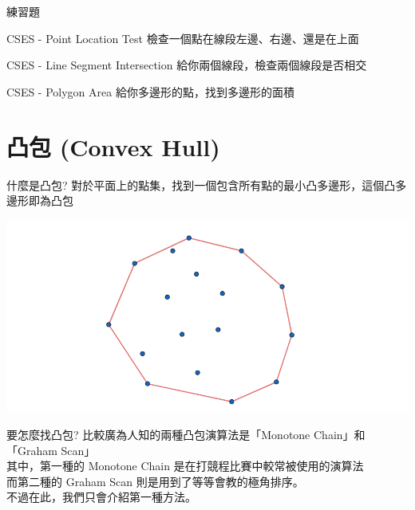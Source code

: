 \documentclass[aspectratio=169]{beamer}
\begin{document}
\begin{frame}{練習題}
    \begin{block}{CSES - Point Location Test}
        檢查一個點在線段左邊、右邊、還是在上面
    \end{block}
    \begin{block}{CSES - Line Segment Intersection}
        給你兩個線段，檢查兩個線段是否相交
    \end{block}
    \begin{block}{CSES - Polygon Area}
        給你多邊形的點，找到多邊形的面積
    \end{block}
\end{frame}

\section{凸包 (Convex Hull)}

\begin{frame}{什麼是凸包?}
    對於平面上的點集，找到一個包含所有點的最小凸多邊形，這個凸多邊形即為凸包
    \begin{center}
        \includegraphics[scale=0.5]{images/convex_hull.png}
    \end{center}
\end{frame}

\begin{frame}{要怎麼找凸包?}
    比較廣為人知的兩種凸包演算法是「Monotone Chain」和「Graham Scan」 \\
    \vspace{2.5mm}
    其中，第一種的 Monotone Chain 是在打競程比賽中較常被使用的演算法 \\
    \vspace{2.5mm}
    而第二種的 Graham Scan 則是用到了等等會教的極角排序。\\
    \vspace{2.5mm}
    不過在此，我們只會介紹第一種方法。
\end{frame}
\end{document}

